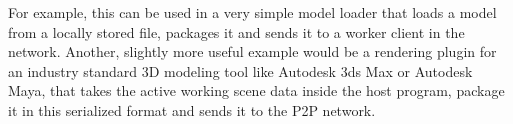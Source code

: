 For example, this can be used in a very simple model loader that loads a model from a locally stored file, packages it and sends it to a worker client in the network. Another, slightly more useful example would be a rendering plugin for an industry standard 3D modeling tool like Autodesk 3ds Max or Autodesk Maya, that takes the active working scene data inside the host program, package it in this serialized format and sends it to the P2P network.


